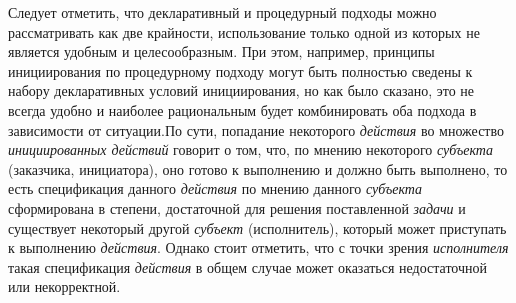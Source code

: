 \begin{SCn}
\begin{scnsubstruct}
\begin{scnindent}
\begin{scneqtoset}
\begin{scnindent}
{\begin{scnitemize}
		                    \end{scnitemize}
		                    Следует отметить, что декларативный и процедурный подходы можно рассматривать как две крайности, использование только одной из которых не является удобным и целесообразным. При этом, например, принципы инициирования по процедурному подходу могут быть полностью сведены к набору декларативных условий инициирования, но как было сказано, это не всегда удобно и наиболее рациональным будет комбинировать оба подхода в зависимости от ситуации.По сути, попадание некоторого \textit{действия} во множество \textit{инициированных действий} говорит о том, что, по мнению некоторого \textit{субъекта} (заказчика, инициатора), оно готово к выполнению и должно быть выполнено, то есть спецификация данного \textit{действия} по мнению данного \textit{субъекта} сформирована в степени, достаточной для решения поставленной \textit{задачи} и существует некоторый другой \textit{субъект} (исполнитель), который может приступать к выполнению \textit{действия}. Однако стоит отметить, что с точки зрения \textit{исполнителя} такая спецификация \textit{действия} в общем случае может оказаться недостаточной или некорректной.}
		            \end{scnindent}
		            \begin{scnindent}

\end{scnindent}
\end{scneqtoset}
\end{scnindent}
\end{scnsubstruct}
\end{SCn}
